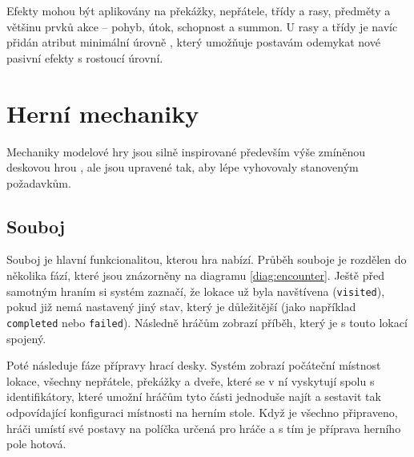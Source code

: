 Efekty mohou být aplikovány na překážky, nepřátele, třídy a rasy, předměty a většinu prvků akce -- pohyb, útok, schopnost a summon. U rasy a třídy je navíc přidán atribut minimální úrovně , který umožňuje postavám odemykat nové pasivní efekty s rostoucí úrovní.


\section{Herní mechaniky}
\label{sec:design_mechanics}

Mechaniky modelové hry jsou silně inspirované především výše zmíněnou deskovou hrou , ale jsou upravené tak, aby lépe vyhovovaly stanoveným požadavkům.


\subsection{Souboj}
\label{subsec:design_encounter}

Souboj je hlavní funkcionalitou, kterou hra nabízí. Průběh souboje je rozdělen do několika fází, které jsou znázorněny na diagramu \ref{diag:encounter}. Ještě před samotným hraním si systém zaznačí, že lokace už byla navštívena (\texttt{visited}), pokud již nemá nastavený jiný stav, který je důležitější (jako například \texttt{completed} nebo \texttt{failed}). Následně hráčům zobrazí příběh, který je s touto lokací spojený.

Poté následuje fáze přípravy hrací desky. Systém zobrazí počáteční místnost lokace, všechny nepřátele, překážky a dveře, které se v ní vyskytují spolu s identifikátory, které umožní hráčům tyto části jednoduše najít a sestavit tak odpovídající konfiguraci místnosti na herním stole. Když je všechno připraveno, hráči umístí své postavy na políčka určená pro hráče a s tím je příprava herního pole hotová.

